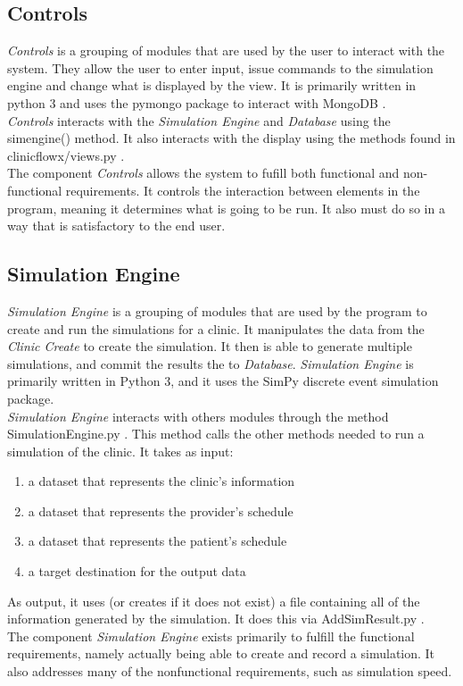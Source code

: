 \documentclass[12pt]{article}
\begin{document}
\subsection{Controls}
\textit{Controls} is a grouping of modules that are used by the user to interact with the system. They allow the user to enter input, issue commands to the simulation engine and change what is displayed by the view. It is primarily written in python 3 and uses the pymongo package to interact with MongoDB .\\
\textit{Controls} interacts with the \textit{Simulation Engine} and
\textit{Database} using the simengine() method. It also interacts with the display using the methods found in clinicflowx/views.py . \\
The component \textit{Controls} allows the system to fufill both functional and non-functional requirements. It controls the interaction between elements in the program, meaning it determines what is going to be run. It also must do so in a way that is satisfactory to the end user. \\
\subsection{Simulation Engine}
\textit{Simulation Engine} is a grouping of modules that are used by the program
to create and run the simulations for a clinic. It manipulates the data
from the \textit{Clinic Create} to create the simulation. It then is able to generate multiple simulations, and commit the results the to \textit{Database}. \textit{Simulation Engine} is primarily written in Python 3, and it uses the SimPy discrete event simulation package. \\
\textit{Simulation Engine} interacts with others modules through the method SimulationEngine.py . This method calls the other methods needed to run a simulation of the clinic. It takes as input: 
\begin{enumerate}
\item a dataset that represents the clinic's information
\item a dataset that represents the provider's schedule
\item a dataset that represents the patient's schedule
\item a target destination for the output data
\end{enumerate}
As output, it uses (or creates if it does not exist) a file containing all of the information generated by the simulation. It does this via AddSimResult.py . \\
The component \textit{Simulation Engine} exists primarily to fulfill the functional requirements, namely actually being able to create and record a simulation. It also addresses many of the nonfunctional requirements, such as simulation speed. \\
\end{document}

